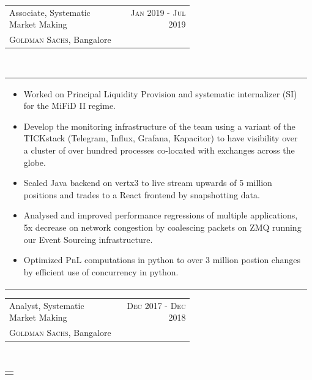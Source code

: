 \documentclass[a4paper]{article} %
\newcommand{\verticalspacing}{-0.25cm}
\newcommand{\bulletspace}{0.7cm}
\newcommand{\projectheadspacing}{6.9cm}
\newcommand{\cproject}[5]{%
    \begin{tabular}{p{0.60\linewidth}r}
        \textcolor{NavyBlue}{\small #2} & \multicolumn{1}{m{ \projectheadspacing{} }}{\raggedleft \small {\textsc{#1}}}\\
        \small {#3} & \small {#4}
    \end{tabular}\\
    \begin{tabular}{p{0.98\linewidth}}
    \vspace{-0.3cm}
        \small{#5}
    \end{tabular}
    \vspace{\verticalspacing{}}
}
\begin{document}
\cproject
      {Jan 2019 - Jul 2019}
      {Associate, Systematic Market Making}
      {\textsc{Goldman Sachs}, Bangalore}
      {}
      {%
        \begin{itemize}[leftmargin=\bulletspace{}]
          \item Worked on Principal Liquidity Provision and systematic internalizer (SI) for the MiFiD II regime.
          \item Develop the monitoring infrastructure of the team using a variant of the TICKstack
              (Telegram, Influx, Grafana, Kapacitor) to have visibility over a cluster of over hundred
              processes co-located with exchanges across the globe.
          \item Scaled Java backend on vertx3 to live stream upwards of 5 million positions
              and trades to a React frontend by snapshotting data.
          \item Analysed and improved performance regressions of multiple applications,
              5x decrease on network congestion by coalescing packets on ZMQ running our Event Sourcing
              infrastructure.
          \item Optimized PnL computations in python to over 3 million postion changes by efficient
              use of concurrency in python.
        \end{itemize}
      }

\cproject
      {Dec 2017 - Dec 2018}
      {Analyst, Systematic Market Making}
      {\textsc{Goldman Sachs}, Bangalore}
      {}
      {%
      }
\end{document}
